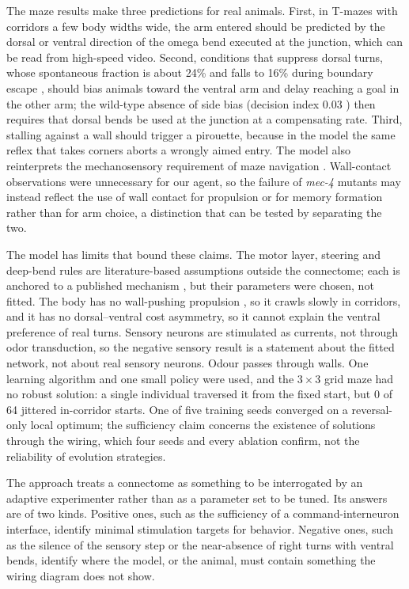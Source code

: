 \documentclass[11pt,a4paper]{article}
\begin{document}
The maze results make three predictions for real animals. First, in T-mazes with corridors a few body widths wide, the arm entered should be predicted by the dorsal or ventral direction of the omega bend executed at the junction, which can be read from high-speed video. Second, conditions that suppress dorsal turns, whose spontaneous fraction is about 24\% and falls to 16\% during boundary escape \cite{r12}, should bias animals toward the ventral arm and delay reaching a goal in the other arm; the wild-type absence of side bias (decision index 0.03 \cite{r3}) then requires that dorsal bends be used at the junction at a compensating rate. Third, stalling against a wall should trigger a pirouette, because in the model the same reflex that takes corners aborts a wrongly aimed entry. The model also reinterprets the mechanosensory requirement of maze navigation \cite{r3}. Wall-contact observations were unnecessary for our agent, so the failure of \textit{mec-4} mutants may instead reflect the use of wall contact for propulsion \cite{r14} or for memory formation rather than for arm choice, a distinction that can be tested by separating the two.

The model has limits that bound these claims. The motor layer, steering and deep-bend rules are literature-based assumptions outside the connectome; each is anchored to a published mechanism \cite{r7,r11}, but their parameters were chosen, not fitted. The body has no wall-pushing propulsion \cite{r14}, so it crawls slowly in corridors, and it has no dorsal--ventral cost asymmetry, so it cannot explain the ventral preference of real turns. Sensory neurons are stimulated as currents, not through odor transduction, so the negative sensory result is a statement about the fitted network, not about real sensory neurons. Odour passes through walls. One learning algorithm and one small policy were used, and the $3\times3$ grid maze had no robust solution: a single individual traversed it from the fixed start, but 0 of 64 jittered in-corridor starts. One of five training seeds converged on a reversal-only local optimum; the sufficiency claim concerns the existence of solutions through the wiring, which four seeds and every ablation confirm, not the reliability of evolution strategies.

The approach treats a connectome as something to be interrogated by an adaptive experimenter rather than as a parameter set to be tuned. Its answers are of two kinds. Positive ones, such as the sufficiency of a command-interneuron interface, identify minimal stimulation targets for behavior. Negative ones, such as the silence of the sensory step or the near-absence of right turns with ventral bends, identify where the model, or the animal, must contain something the wiring diagram does not show.
\end{document}
